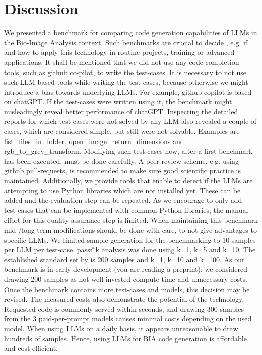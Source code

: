 \documentclass{ecai}
\begin{document}

\section{Discussion}

We presented a benchmark for comparing code generation capabilities of LLMs in the Bio-Image Analysis context. Such benchmarks are crucial to decide , e.g. if and how to apply this technology in routine projects, training or advanced applications. 
It shall be mentioned that we did not use any code-completion tools, such as github co-pilot, to write the test-cases. It is necessary to not use such LLM-based tools while writing the test-cases, because otherwise we might introduce a bias towards underlying LLMs. For example, github-copilot is based on chatGPT. If the test-cases were written using it, the benchmark might misleadingly reveal better performance of chatGPT.
Inspecting the detailed reports for which test-cases were not solved by any LLM also revealed a couple of cases, which are considered simple, but still were not solvable. Examples are list\_files\_in\_folder, open\_image\_return\_dimensions and rgb\_to\_grey\_transform. Modifying such test-cases now, after a first benchmark has been executed, must be done carefully. A peer-review scheme, e.g. using github pull-requests, is recommended to make sure good scientific practice is maintained. Additionally, we provide tools that enable to detect if the LLMs are attempting to use Python libraries which are not installed yet. These can be added and the evaluation step can be repeated. As we encourage to only add test-cases that can be implemented with common Python libraries, the manual effort for this quality assurance step is limited. When maintaining this benchmark mid-/long-term modifications should be done with care, to not give advantages to specific LLMs.
We limited sample generation for the benchmarking to 10 samples per LLM per test-case. pass@k analysis was done using k=1, k=5 and k=10. The established standard set by \citep{chen2021evaluating} is 200 samples and k=1, k=10 and k=100. As our benchmark is in early development (you are reading a preprint), we considered drawing 200 samples as not well-invested compute time and unnecessary costs. Once the benchmark contains more test-cases and models, this decision may be revised. 
The measured costs also demonstrate the potential of the technology. Requested code is commonly served within seconds, and drawing 300 samples from the 3 paid-per-prompt models causes minimal costs depending on the used model. When using LLMs on a daily basis, it appears unreasonable to draw hundreds of samples. Hence, using LLMs for BIA code generation is affordable and cost-efficient.
\end{document}
